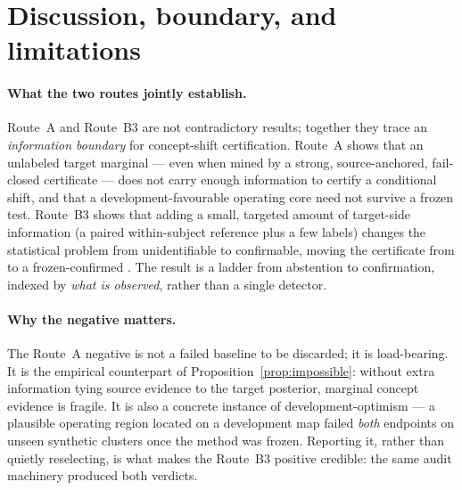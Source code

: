 \section{Discussion, boundary, and limitations}
\label{sec:discussion}

\paragraph{What the two routes jointly establish.}
Route~A and Route~B3 are not contradictory results; together they trace an \emph{information boundary} for
concept-shift certification. Route~A shows that an unlabeled target marginal --- even when mined by a strong,
source-anchored, fail-closed certificate --- does not carry enough information to certify a conditional shift,
and that a development-favourable operating core need not survive a frozen test. Route~B3 shows that adding a
small, targeted amount of target-side information (a paired within-subject reference plus a few labels) changes
the statistical problem from unidentifiable to confirmable, moving the certificate from \stunid{} to a
frozen-confirmed \stconf{}. The result is a ladder from abstention to confirmation, indexed by \emph{what is
observed}, rather than a single detector.

\paragraph{Why the negative matters.}
The Route~A negative is not a failed baseline to be discarded; it is load-bearing. It is the empirical
counterpart of Proposition~\ref{prop:impossible}: without extra information tying source evidence to the
target posterior, marginal concept evidence is fragile. It is also a concrete instance of
development-optimism --- a plausible operating region located on a development map failed \emph{both} endpoints
on unseen synthetic clusters once the method was frozen. Reporting it, rather than quietly reselecting, is what
makes the Route~B3 positive credible: the same audit machinery produced both verdicts.

